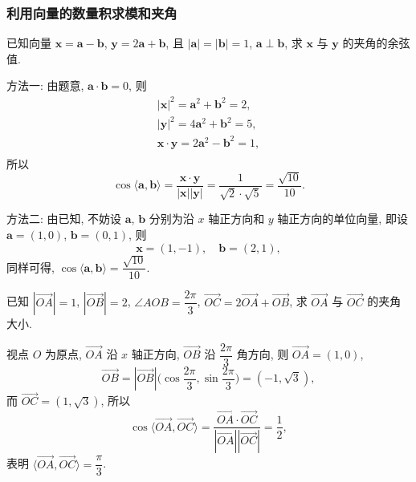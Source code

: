 \subsubsection{利用向量的数量积求模和夹角}
\begin{example}
    已知向量 $\bm{x}=\bm{a}-\bm{b}$, $\bm{y}=2\bm{a}+\bm{b}$, 且 $|\bm{a}|=|\bm{b}|=1$, $\bm{a}\perp\bm{b}$, 求 $\bm{x}$ 与 $\bm{y}$ 的夹角的余弦值.
\end{example}
\beginsolution
    方法一: 由题意, $\bm{a}\cdot\bm{b}= 0$, 则
    \[\begin{gathered}
        |\bm{x}|^2= \bm{a}^2+ \bm{b}^2= 2,\\
        |\bm{y}|^2= 4\bm{a}^2+ \bm{b}^2= 5,\\
        \bm{x}\cdot\bm{y}= 2\bm{a}^2- \bm{b}^2= 1,\\
    \end{gathered}\]
    所以 
    \[\cos\langle\bm{a},\bm{b}\rangle
        = \frac{\bm{x}\cdot\bm{y}}{|\bm{x}| |\bm{y}|}
        = \frac{1}{\sqrt{2}\cdot\sqrt{5}}
        = \frac{\sqrt{10}}{10}.\]
    
    方法二: 由已知, 不妨设 $\bm{a}$, $\bm{b}$ 分别为沿 $x$ 轴正方向和 $y$ 轴正方向的单位向量, 
    即设 $\bm{a}= (1,0)$, $\bm{b}= (0,1)$, 则
    \[\bm{x}= (1,-1),\quad \bm{b}= (2,1),\]
    同样可得, $\cos\langle\bm{a},\bm{b}\rangle= \dfrac{\sqrt{10}}{10}$.
\endsolution

\lianxi
\begin{exercise}[s]
    已知 $|\overrightarrow{OA}|=1$, $|\overrightarrow{OB}|=2$, 
    $\angle AOB= \dfrac{2\pi}3$, $\overrightarrow{OC}= 2\overrightarrow{OA} + \overrightarrow{OB}$, 求 $\overrightarrow{OA}$ 与 $\overrightarrow{OC}$ 的夹角大小.
\end{exercise}
\beginsolution
    视点 $O$ 为原点, $\overrightarrow{OA}$ 沿 $x$ 轴正方向, $\overrightarrow{OB}$ 沿 $\dfrac{2\pi}3$ 角方向, 则 $\overrightarrow{OA}= (1,0)$,
    \[\overrightarrow{OB}
        = |\overrightarrow{OB}| \biggl(\cos\frac{2\pi}3, \sin\frac{2\pi}3\biggr)
        = (-1,\sqrt3),\]
    而 $\overrightarrow{OC}= (1,\sqrt3)$, 所以
    \[\cos\langle\overrightarrow{OA}, \overrightarrow{OC}\rangle
        = \frac{\overrightarrow{OA}\cdot \overrightarrow{OC}}
            {|\overrightarrow{OA}| |\overrightarrow{OC}|}
        = \frac12,\]
    表明 $\langle\overrightarrow{OA}, \overrightarrow{OC}\rangle= \dfrac\pi3$.
\endsolution

